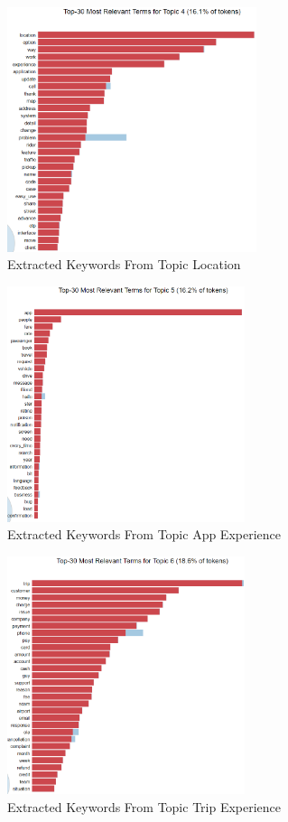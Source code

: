 \documentclass[12pt]{article}
\begin{document}
\begin{figure}[h]
    \centering
    \includegraphics[width=0.65\textwidth]{figures/topic_location.png}
    \caption{Extracted Keywords From Topic Location}
    \label{fig:my_label}
\end{figure}

\begin{figure}[h]
    \centering
    \includegraphics[width=0.62\textwidth]{figures/topic_app_experience.png}
    \caption{Extracted Keywords From Topic App Experience}
    \label{fig:my_label}
\end{figure}

\begin{figure}[h]
    \centering
    \includegraphics[width=0.62\textwidth]{figures/topic_trip_exp.png}
    \caption{Extracted Keywords From Topic Trip Experience}
    \label{fig:my_label}
\end{figure}
\end{document}

